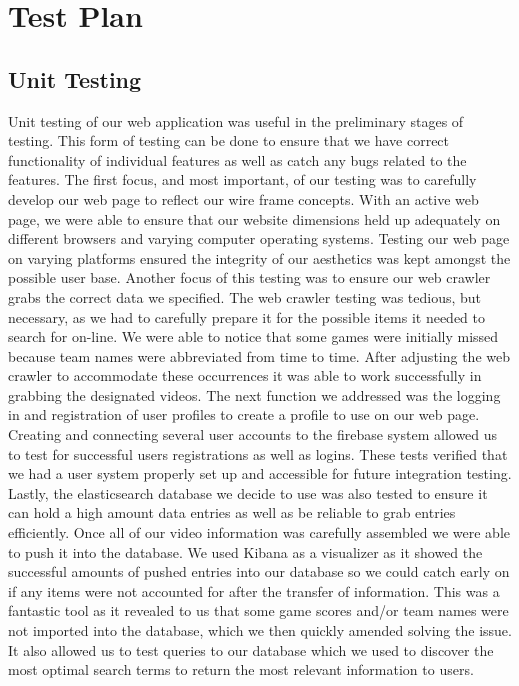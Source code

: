 \chapter{Test Plan}

\section{Unit Testing}
\par Unit testing of our web application was useful in the preliminary stages of testing. This form of testing can be done to ensure that we have correct functionality of individual features as well as catch any bugs related to the features. The first focus, and most important, of our testing was to carefully develop our web page to reflect our wire frame concepts. With an active web page, we were able to ensure that our website dimensions held up adequately on different browsers and varying computer operating systems. Testing our web page on varying platforms ensured the integrity of our aesthetics was kept amongst the possible user base. Another focus of this testing was to ensure our web crawler grabs the correct data we specified. The web crawler testing was tedious, but necessary, as we had to carefully prepare it for the possible items it needed to search for on-line. We were able to notice that some games were initially missed because team names were abbreviated from time to time. After adjusting the web crawler to accommodate these occurrences it was able to work successfully in grabbing the designated videos. The next function we addressed was the logging in and registration of user profiles to create a profile to use on our web page. Creating and connecting several user accounts to the firebase system allowed us to test for successful users registrations as well as logins. These tests verified that we had a user system properly set up and accessible for future integration testing. Lastly, the elasticsearch database we decide to use was also tested to ensure it can hold a high amount data entries as well as be reliable to grab entries efficiently. Once all of our video information was carefully assembled we were able to push it into the database. We used Kibana as a visualizer as it showed the successful amounts of pushed entries into our database so we could catch early on if any items were not accounted for after the transfer of information. This was a fantastic tool as it revealed to us that some game scores and/or team names were not imported into the database, which we then quickly amended solving the issue. It also allowed us to test queries to our database which we used to discover the most optimal search terms to return the most relevant information to users. 


